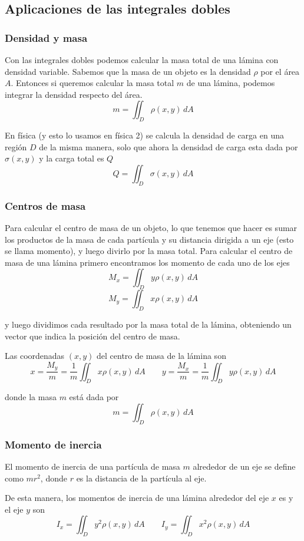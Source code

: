 \documentclass[12pt]{article}
\begin{document}
\subsection{Aplicaciones de las integrales dobles}
\subsubsection{Densidad y masa}
Con las integrales dobles podemos calcular la masa total de una lámina con densidad variable. Sabemos que la masa de un objeto es la densidad $ \rho $ por el área $ A $. Entonces si queremos calcular la masa total $ m $ de una lámina, podemos integrar la densidad respecto del área.
\[
  m=\iint_{D} \rho(x,y) \,dA
\]

En física (y esto lo usamos en física 2) se calcula la densidad de carga en una región $ D $ de la misma manera, solo que ahora la densidad de carga esta dada por $ \sigma(x,y) $ y la carga total es $ Q $
\[
  Q=\iint_{D} \sigma(x,y) \,dA
\]

\subsubsection{Centros de masa}
Para calcular el centro de masa de un objeto, lo que tenemos que hacer es sumar los productos de la masa de cada partícula y su distancia dirigida a un eje (esto se llama momento), y luego divirlo por la masa total. Para calcular el centro de masa de una lámina primero encontramos los momento de cada uno de los ejes
\[
  M_{x}=\iint_{D} y\rho(x,y) \,dA
\]
\[
  M_{y}=\iint_{D} x\rho(x,y) \,dA
\]

y luego dividimos cada resultado por la masa total de la lámina, obteniendo un vector que indica la posición del centro de masa.

Las coordenadas $ (x,y) $ del centro de masa de la lámina son 
\[
  x=\frac{M_{y}}{m}=\frac{1}{m}\iint_{D} x\rho(x,y) \,dA \qquad   y=\frac{M_{x}}{m}=\frac{1}{m}\iint_{D} y\rho(x,y) \,dA
\]

donde la masa $ m $ está dada por 
\[
  m=\iint_{D} \rho(x,y) \,dA
\]

\subsubsection{Momento de inercia}
El momento de inercia de una partícula de masa $ m $ alrededor de un eje se define como $ mr^2 $, donde $ r $ es la distancia de la partícula al eje.

De esta manera, los momentos de inercia de una lámina alrededor del eje $ x $ es y el eje $ y $ son	
\[
  I_{x}=\iint_{D} y^2\rho(x,y) \,dA \qquad I_{y}=\iint_{D} x^2\rho(x,y) \,dA
\]
\end{document}
